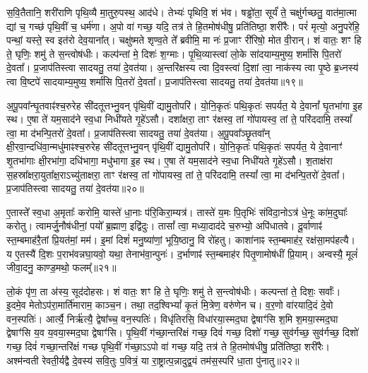 स॒वि॒तैतानि॒ शरी॑राणि पृथि॒व्यै मा॒तुरु॒पस्थ॒ आद॑धे। 
तेभ्यः॑ पृथिवि॒ शं भ॑व। 
षड्ढो॑ता॒ सूर्यं॑ ते॒ चक्षु॑र्गच्छतु॒ वात॑मा॒त्मा द्यां च॒ गच्छ॑ पृथि॒वीं च॒ धर्म॑णा। 
अ॒पो वा॑ गच्छ॒ यदि॒ तत्र॑ ते हि॒तमोष॑धीषु॒ प्रति॑तिष्ठा॒ शरी॑रैः। 
परं॑ मृत्यो॒ अनु॒परे॑हि॒ पन्थां॒ यस्ते॒ स्व इत॑रो देव॒याना᳚त्। 
चक्षु॑ष्मते शृण्व॒ते ते᳚ ब्रवीमि॒ मा नः॑ प्र॒जाꣳ री॑रिषो॒ मोत वी॒रान्। 
शं वातः॒ शꣳ हि ते॒ घृणिः॒ शमु॑ ते स॒न्त्वोष॑धीः। 
कल्प॑न्तां मे॒ दिशः॑ श॒ग्माः। 
पृ॒थि॒व्यास्त्वा॑ लो॒के सा॑दयाम्य॒मुष्य॒ शर्मा॑सि पि॒तरो॑ दे॒वता᳚। 
प्र॒जाप॑तिस्त्वा सादयतु॒ तया॑ दे॒वत॑या। 
अ॒न्तरि॑क्षस्य त्वा दि॒वस्त्वा॑ दि॒शां त्वा॒ नाक॑स्य त्वा पृ॒ष्ठे ब्र॒ध्नस्य॑ त्वा वि॒ष्टपे॑ सादयाम्य॒मुष्य॒ शर्मा॑सि पि॒तरो॑ दे॒वता᳚। 
प्र॒जाप॑तिस्त्वा सादयतु॒ तया॑ दे॒वत॑या॥१९॥

अ॒पू॒पवा᳚न्घृ॒तवाꣴ॑श्च॒रुरेह सी॑दतूत्तभ्नु॒वन् पृ॑थि॒वीं द्यामु॒तोपरि॑। 
यो॒नि॒कृतः॑ पथि॒कृतः॑ सपर्यत॒ ये दे॒वानां᳚ घृ॒तभा॑गा इ॒ह स्थ। 
ए॒षा ते॑ यम॒साद॑ने स्व॒धा निधी॑यते गृ॒हे॑ऽसौ। 
दशा᳚क्षरा॒ ताꣳ र॑क्षस्व॒ तां गो॑पायस्व॒ तां ते॒ परि॑ददामि॒ तस्यां᳚ त्वा॒ मा द॑भन्पि॒तरो॑ दे॒वता᳚। 
प्र॒जाप॑तिस्त्वा सादयतु॒ तया॑ दे॒वत॑या। 
अ॒पू॒पवा᳚ञ्छृ॒तवा᳚न् क्षी॒रवा॒न्दधि॑वा॒न्मधु॑माꣴश्च॒रुरेह सी॑दतूत्तभ्नु॒वन् पृ॑थि॒वीं द्यामु॒तोपरि॑। 
यो॒नि॒कृतः॑ पथि॒कृतः॑ सपर्यत॒ ये दे॒वानाꣳ॑ शृ॒तभा॑गाः क्षी॒रभा॑गा॒ दधि॑भागा॒ मधु॑भागा इ॒ह स्थ। 
ए॒षा ते॑ यम॒साद॑ने स्व॒धा निधी॑यते गृ॒हे॑ऽसौ। 
श॒ताक्ष॑रा स॒हस्रा᳚क्षरा॒युता᳚क्ष॒राऽच्यु॑ताक्षरा॒ ताꣳ र॑क्षस्व॒ तां गो॑पायस्व॒ तां ते॒ परि॑ददामि॒ तस्यां᳚ त्वा॒ मा द॑भन्पि॒तरो॑ दे॒वता᳚। 
प्र॒जाप॑तिस्त्वा सादयतु॒ तया॑ दे॒वत॑या॥२०॥
\anuvakamend[अन॑पस्फुरन्ती॒रुत्त॑र दे॒वत॑या॒ द्वे च॑]

ए॒तास्ते᳚ स्व॒धा अ॒मृताः᳚ करोमि॒ यास्ते॑ धा॒नाः प॑रि॒किरा॒म्यत्र॑। 
तास्ते॑ य॒मः पि॒तृभिः॑ संविदा॒नोऽत्र॑ धे॒नूः का॑म॒दुघाः᳚ करोतु। 
त्वामर्जु॒नौष॑धीनां॒ पयो᳚ ब्र॒ह्माण॒ इद्वि॑दुः। 
तासां᳚ त्वा॒ मध्या॒दाद॑दे च॒रुभ्यो॒ अपि॑धातवे। 
दू॒र्वाणाꣴ॑ स्त॒म्बमाह॑रै॒तां प्रि॒यत॑मां॒ मम॑। 
इ॒मां दिशं॑ मनु॒ष्या॑णां॒ भूयि॒ष्ठानु॒ वि रो॑हतु। 
काशा॑नाꣴ स्त॒म्बमाह॑र॒ रक्ष॑सा॒मप॑हत्यै। 
य ए॒तस्यै॑ दि॒शः प॒राभ॑वन्नघा॒यवो॒ यथा॒ तेनाभ॑वा॒न्पुनः॑। 
द॒र्भाणाꣴ॑ स्त॒म्बमाह॑र पितृ॒णामोष॑धीं प्रि॒याम्। 
अन्वस्यै॒ मूलं॑ जीवा॒दनु॒ काण्ड॒मथो॒ फलम्᳚॥२१॥

लो॒कं पृ॑ण॒ ता अ॑स्य॒ सूद॑दोहसः। 
शं वातः॒ शꣳ हि ते॒ घृणिः॒ शमु॑ ते स॒न्त्वोष॑धीः। 
कल्पन्तां ते॒ दिशः॒ सर्वाः᳚। 
इ॒दमे॒व मेतोऽप॑रा॒मार्ति॑माराम॒ काञ्च॒न। 
तथा॒ तद॒श्विभ्यां᳚ कृ॒तं मि॒त्रेण॒ वरु॑णेन च। 
व॒र॒णो वा॑रयादि॒दं दे॒वो वन॒स्पतिः॑। 
आर्त्यै॒ निर्\mbox{}ऋ॑त्यै॒ द्वेषा᳚च्च॒ वन॒स्पतिः॑। 
विधृ॑तिरसि॒ विधा॑रया॒स्मद॒घा द्वेषाꣳ॑सि श॒मि श॒मया॒स्मद॒घा द्वेषाꣳ॑सि य॒व य॒वया॒स्मद॒घा द्वेषाꣳ॑सि। 
पृ॒थि॒वीं ग॑च्छा॒न्तरि॑क्षं गच्छ॒ दिवं॑ गच्छ॒ दिशो॑ गच्छ॒ सुव॑र्गच्छ॒ सुव॑र्गच्छ॒ दिशो॑ गच्छ॒ दिवं॑ गच्छा॒न्तरि॑क्षं गच्छ पृथि॒वीं ग॑च्छा॒ऽऽपो वा॑ गच्छ॒ यदि॒ तत्र॑ ते हि॒तमोष॑धीषु॒ प्रति॑तिष्ठा॒ शरी॑रैः। 
अश्म॑न्वती रेवती॒र्यद्वै दे॒वस्य॑ सवि॒तुः प॒वित्रं॒ या रा॒ष्ट्रात्प॒न्नादुद्व॒यं तम॑स॒स्परि॑ धा॒ता पु॑नातु॥२२॥
\anuvakamend[फलं॑ पुनातु]

